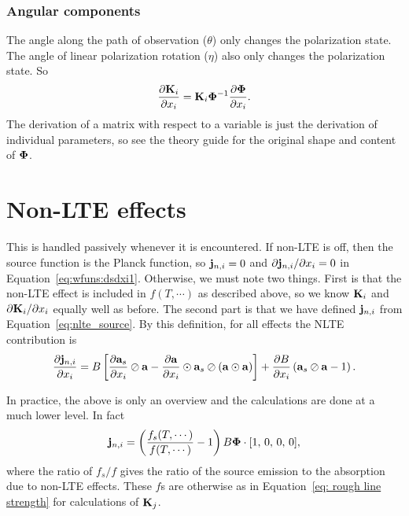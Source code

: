 \subsubsection{Angular components}
The angle along the path of observation ($\theta$) only changes the polarization state. 
The angle of linear polarization rotation ($\eta$) also only changes the polarization state.
So
\begin{equation}
   \frac{\partial \mathbf{K}_i}{\partial x_i} = \mathbf{K}_i \mathbf{\Phi}^{-1}\frac{\partial \mathbf{\Phi}}{\partial x_i}.
\end{equation}
The derivation of a matrix with respect to a variable is just the derivation of individual parameters, so see
the theory guide for the original shape and content of $\mathbf{\Phi}$.

\section{Non-LTE effects}
\label{sec:wfuns:nlte}

This is handled passively whenever it is encountered.  If non-LTE is off, then the source function is
the Planck function, so ${\bf j}_{n,i}=0$ and $\partial {\bf j}_{n,i} /\partial x_i=0$ in Equation~\ref{eq:wfuns:dsdxi1}.
Otherwise, we must note two things.  First is that the non-LTE effect is included in $f(T,\cdots)$ as described above,
so we know $\mathbf{K}_i$ and ${\partial \mathbf{K}_i}/{\partial x_i}$ equally well as before.  The second part is that 
we have defined ${\bf j}_{n,i}$ from Equation~\ref{eq:nlte_source}.  By this definition, for all effects the NLTE
contribution is 
\begin{equation}
  \frac{\partial {\bf j}_{n,i}}{\partial x_i} = B
   \left[\frac{\partial {\bf a}_{s}}{\partial x_i}\oslash{\bf a} - \frac{\partial {\bf a}}{\partial x_i}\odot{\bf a}_{s}\oslash\left({\bf a}\odot{\bf a}\right)\right]
  +\frac{\partial B}{\partial x_i}\left({\bf a}_{s}\oslash{\bf a}-1\right).
\end{equation}

In practice, the above is only an overview and the calculations are done at a much lower level.  In fact
\begin{equation}
  {\bf j}_{n,i} = \left(\frac{f_s(T,\cdots)}{f(T,\cdots)}-1\right)B\mathbf{\Phi}\cdot[1,\,0,\,0,\,0],
\end{equation}
where the ratio of $f_s/f$ gives the ratio of the source emission to the absorption due to non-LTE effects.
These $f$s are otherwise as in Equation~\ref{eq: rough line strength} for calculations of $\mathbf{K}_j$.

